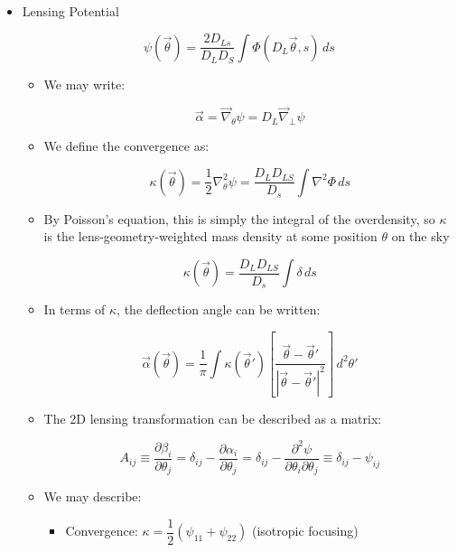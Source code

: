 \begin{itemize}
\begin{itemize}
\begin{itemize}
              $$\theta_+=\beta+\frac{\theta_E^2}{\beta}$$
              $$\theta_-&=-\frac{\theta_E^2}{\beta}\to0$$

          \end{itemize}

    \end{itemize}

  \item Lensing Potential

    $$\psi(\vec{\theta})=\frac{2D_{Ls}}{D_LD_S}\int \Phi(D_L\vec{\theta},s)\,ds$$

    \begin{itemize}

      \item We may write:

        $$\vec{\alpha}=\vec{\nabla}_\theta\psi=D_L\vec{\nabla}_{\perp}\psi$$

      \item We define the convergence as:

        $$\kappa(\vec{\theta})=\frac{1}{2}\nabla^2_{\theta}\psi=\frac{D_LD_{LS}}{D_s}\int\nabla^2\Phi\,ds$$

      \item By Poisson's equation, this is simply the integral of the overdensity, so $\kappa$ is the lens-geometry-weighted mass density at some position $\theta$ on the sky

        $$\kappa(\vec{\theta})=\frac{D_LD_{LS}}{D_s}\int\delta\,ds$$

      \item In terms of $\kappa$, the deflection angle can be written:

        $$\vec{\alpha}(\vec{\theta})=\frac{1}{\pi}\int\kappa(\vec{\theta}')\left[ \frac{\vec{\theta}-\vec{\theta}'}{|\vec{\theta}-\vec{\theta}'|^2} \right]\,d^2\theta'$$

      \item The 2D lensing transformation can be described as a matrix:

        $$A_{ij}\equiv\frac{\partial\beta_i}{\partial\theta_j}=\delta_{ij}-\frac{\partial \alpha_i}{\partial \theta_j}=\delta_{ij}-\frac{\partial^2\psi}{\partial\theta_i\partial\theta_j}\equiv \delta_{ij}-\psi_{ij}$$

      \item We may describe:

        \begin{itemize}

          \item Convergence: $\kappa=\dfrac{1}{2}(\psi_{11}+\psi_{22})$ (isotropic focusing)


\end{itemize}
\end{itemize}
\end{itemize}
